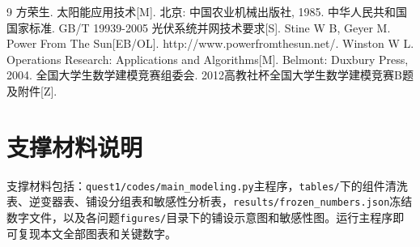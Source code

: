 \documentclass[UTF8,a4paper,12pt]{ctexart}
\begin{document}
\begin{thebibliography}{9}
 方荣生. 太阳能应用技术[M]. 北京: 中国农业机械出版社, 1985.
 中华人民共和国国家标准. GB/T 19939-2005 光伏系统并网技术要求[S].
 Stine W B, Geyer M. Power From The Sun[EB/OL]. http://www.powerfromthesun.net/.
 Winston W L. Operations Research: Applications and Algorithms[M]. Belmont: Duxbury Press, 2004.
 全国大学生数学建模竞赛组委会. 2012高教社杯全国大学生数学建模竞赛B题及附件[Z].
\end{thebibliography}

\appendix
\section{支撑材料说明}
支撑材料包括：\verb|quest1/codes/main_modeling.py|主程序，\verb|tables/|下的组件清洗表、逆变器表、铺设分组表和敏感性分析表，\verb|results/frozen_numbers.json|冻结数字文件，以及各问题\verb|figures/|目录下的铺设示意图和敏感性图。运行主程序即可复现本文全部图表和关键数字。
\end{document}
